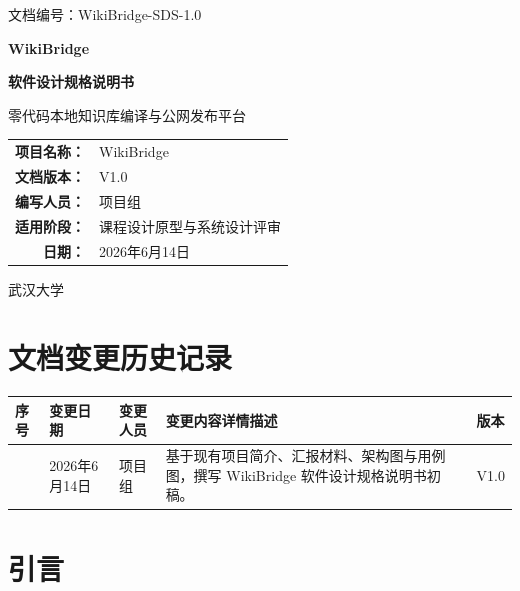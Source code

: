 \documentclass[UTF8,a4paper,12pt,fontset=fandol]{ctexart}
\newcommand{\docid}{WikiBridge-SDS-1.0}
\newcommand{\docdate}{2026年6月14日}
\begin{document}
\begin{titlepage}
  \thispagestyle{empty}
  \begin{flushleft}
    \small 文档编号：\docid
  \end{flushleft}
  \vspace*{2.2cm}
  \begin{center}
    {\bfseries WikiBridge\par}
    \vspace{0.5cm}
    {\bfseries 软件设计规格说明书\par}
    \vspace{0.8cm}
    {\large 零代码本地知识库编译与公网发布平台\par}
    \vspace{2.4cm}
    \begin{tabular}{>{\bfseries}r l}
      项目名称： & WikiBridge \\
      文档版本： & V1.0 \\
      编写人员： & 项目组 \\
      适用阶段： & 课程设计原型与系统设计评审 \\
      日期： & \docdate \\
    \end{tabular}
  \end{center}
  \vfill
  \begin{center}
    武汉大学
  \end{center}
\end{titlepage}

\section*{文档变更历史记录}
\begin{longtable}{>{\centering\arraybackslash}p{1.2cm}>{\centering\arraybackslash}p{2.8cm}>{\centering\arraybackslash}p{2.2cm}p{6.4cm}>{\centering\arraybackslash}p{1.8cm}}
\toprule
序号 & 变更日期 & 变更人员 & 变更内容详情描述 & 版本 \\
\midrule
1 & 2026年6月14日 & 项目组 & 基于现有项目简介、汇报材料、架构图与用例图，撰写 WikiBridge 软件设计规格说明书初稿。 & V1.0 \\
\bottomrule
\end{longtable}

\newpage
\tableofcontents
\newpage
{}

\section{引言}
\end{document}
